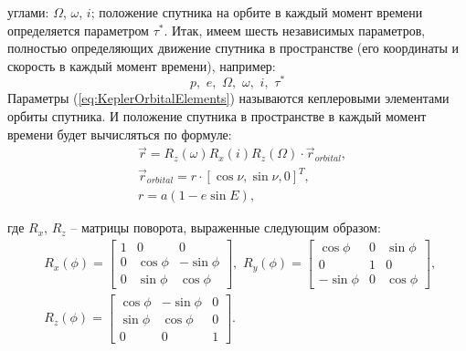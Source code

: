 углами: $\Omega$, $\omega$, $i$; положение спутника на орбите в каждый момент времени
определяется параметром $\tau^*$. Итак, имеем шесть независимых параметров, полностью
определяющих движение спутника в пространстве (его координаты и скорость в каждый
момент времени), например:
\begin{equation} \label{eq:KeplerOrbitalElements}
  p,\,\, e,\,\, \Omega,\,\, \omega,\,\, i,\,\, \tau^*
\end{equation}
Параметры (\ref{eq:KeplerOrbitalElements}) называются кеплеровыми элементами
орбиты спутника.
И положение спутника в пространстве в каждый момент времени будет вычисляться по формуле:
\begin{equation}
  \begin{aligned}
    & \vec{r} = R_z(\omega)R_x(i)R_z(\Omega) \cdot \vec{r}_{orbital}, \\
    & \vec{r}_{orbital} = r \cdot [\cos\nu, \sin\nu, 0]^{T}, \\
    & r = a(1 - e\sin E),
  \end{aligned}
\end{equation}\par
где $R_x$, $R_z$ -- матрицы поворота, выраженные следующим образом:
\begin{equation}
    \begin{aligned}
        &R_x(\phi) = \begin{bmatrix}
           1        &  0        &   0        \\
           0        &  \cos\phi &  -\sin\phi \\
           0        &  \sin\phi &   \cos\phi
        \end{bmatrix},\,\,
        R_y(\phi) = \begin{bmatrix}
           \cos\phi &  0        &  \sin\phi \\
           0        &  1        &  0        \\
          -\sin\phi &  0        &  \cos\phi
        \end{bmatrix},\,\, \\
        &R_z(\phi) = \begin{bmatrix}
          \cos\phi & -\sin\phi & 0 \\
          \sin\phi &  \cos\phi & 0 \\
          0        &  0        & 1
        \end{bmatrix}.
    \end{aligned}
\end{equation}
%

